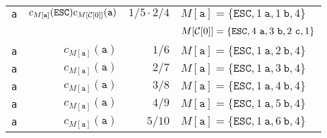 \begin{tabular}{crrl}
    {\tt a} & $c_{M[\mathtt{a}]}(\mathtt{ESC})c_{M[{\cal C}[0]]}(\mathtt a)$ & $1/5\cdot 2/4$ & $M[\mathtt{a}]=\{\mathtt{ESC},1~\mathtt{a},1~\mathtt{b},4\}$\\
    ~       & & & $M[{\cal C}[0]]=\{\mathtt{ESC},4~\mathtt{a},3~\mathtt{b},2~\mathtt{c},1\}$\\
    {\tt a} & $c_{M[\mathtt{a}]}(\mathtt a)$ & $1/6$ & $M[\mathtt{a}]=\{\mathtt{ESC},1~\mathtt{a},2~\mathtt{b},4\}$\\
    {\tt a} & $c_{M[\mathtt{a}]}(\mathtt a)$ & $2/7$ & $M[\mathtt{a}]=\{\mathtt{ESC},1~\mathtt{a},3~\mathtt{b},4\}$\\
    {\tt a} & $c_{M[\mathtt{a}]}(\mathtt a)$ & $3/8$ & $M[\mathtt{a}]=\{\mathtt{ESC},1~\mathtt{a},4~\mathtt{b},4\}$\\
    {\tt a} & $c_{M[\mathtt{a}]}(\mathtt a)$ & $4/9$ & $M[\mathtt{a}]=\{\mathtt{ESC},1~\mathtt{a},5~\mathtt{b},4\}$\\
    {\tt a} & $c_{M[\mathtt{a}]}(\mathtt a)$ & $5/10$ & $M[\mathtt{a}]=\{\mathtt{ESC},1~\mathtt{a},6~\mathtt{b},4\}$
  \end{tabular}
